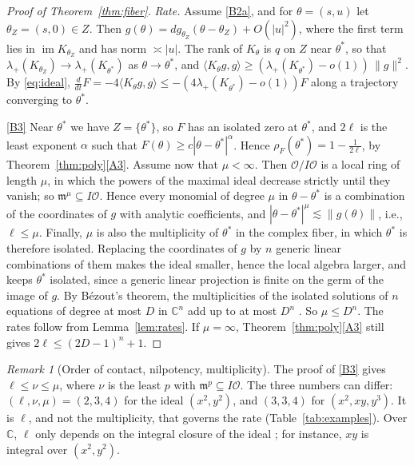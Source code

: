 \documentclass[11pt]{article}
\theoremstyle{definition}
\theoremstyle{remark}
\newtheorem{remark}[lemma]{Remark}
\newcommand{\C}{\mathbb{C}}
\newcommand{\cO}{\mathcal{O}}
\newcommand{\fm}{\mathfrak{m}}
\newcommand{\ip}[2]{\langle #1,#2\rangle}
\DeclareMathOperator{\im}{im}
\begin{document}
\begin{proof}[Proof of Theorem~\ref{thm:fiber}]
\emph{Rate.} Assume \ref{B2a}, and for $\theta=(s,u)$ let $\theta_Z=(s,0)\in Z$. Then $g(\theta)=dg_{\theta_Z}(\theta-\theta_Z)+O(|u|^2)$, where the first term lies in $\im K_{\theta_Z}$ and has norm $\asymp|u|$. The rank of $K_\theta$ is $q$ on $Z$ near $\theta^*$, so that $\lambda_+(K_{\theta_Z})\to\lambda_+(K_{\theta^*})$ as $\theta\to\theta^*$, and $\ip{K_\theta g}{g}\ge(\lambda_+(K_{\theta^*})-o(1))\,\|g\|^2$. By \eqref{eq:ideal}, $\frac{d}{dt}F=-4\ip{K_\theta g}{g}\le-(4\lambda_+(K_{\theta^*})-o(1))F$ along a trajectory converging to $\theta^*$.

\ref{B3} Near $\theta^*$ we have $Z=\{\theta^*\}$, so $F$ has an isolated zero at $\theta^*$, and $2\ell$ is the least exponent $\alpha$ such that $F(\theta)\ge c|\theta-\theta^*|^\alpha$. Hence $\rho_F(\theta^*)=1-\frac1{2\ell}$, by Theorem~\ref{thm:poly}\ref{A3}. Assume now that $\mu<\infty$. Then $\cO/I\cO$ is a local ring of length $\mu$, in which the powers of the maximal ideal decrease strictly until they vanish; so $\fm^\mu\subseteq I\cO$. Hence every monomial of degree $\mu$ in $\theta-\theta^*$ is a combination of the coordinates of $g$ with analytic coefficients, and $|\theta-\theta^*|^\mu\lesssim\|g(\theta)\|$, i.e., $\ell\le\mu$. Finally, $\mu$ is also the multiplicity of $\theta^*$ in the complex fiber, in which $\theta^*$ is therefore isolated. Replacing the coordinates of $g$ by $n$ generic linear combinations of them makes the ideal smaller, hence the local algebra larger, and keeps $\theta^*$ isolated, since a generic linear projection is finite on the germ of the image of $g$. By B\'ezout's theorem, the multiplicities of the isolated solutions of $n$ equations of degree at most $D$ in $\C^n$ add up to at most $D^n$ \cite[\S12.3]{Ful98}. So $\mu\le D^n$. The rates follow from Lemma~\ref{lem:rates}. If $\mu=\infty$, Theorem~\ref{thm:poly}\ref{A3} still gives $2\ell\le(2D-1)^n+1$.
\end{proof}

\begin{remark}[Order of contact, nilpotency, multiplicity]\label{rem:mult}
The proof of \ref{B3} gives $\ell\le\nu\le\mu$, where $\nu$ is the least $p$ with $\fm^p\subseteq I\cO$. The three numbers can differ: $(\ell,\nu,\mu)=(2,3,4)$ for the ideal $(x^2,y^2)$, and $(3,3,4)$ for $(x^2,xy,y^3)$. It is $\ell$, and not the multiplicity, that governs the rate (Table~\ref{tab:examples}). Over $\C$, $\ell$ only depends on the integral closure of the ideal \cite{LT08}; for instance, $xy$ is integral over $(x^2,y^2)$.
\end{remark}
\end{document}
